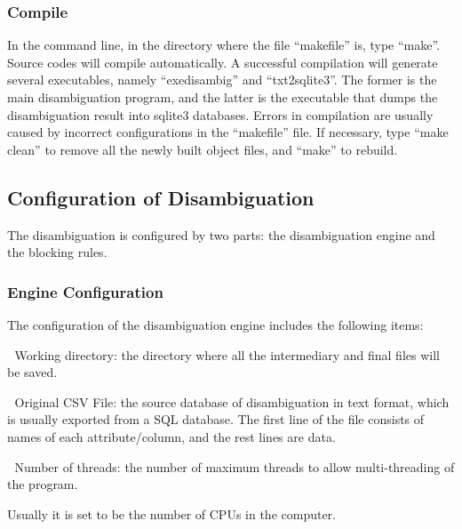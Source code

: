 \documentclass{article}
\begin{document}
\subsubsection{Compile}

In the command line, in the directory where the 
file “makefile” is, type “make”. 
Source codes will compile automatically. A successful 
compilation will generate several executables, namely
“exedisambig” and “txt2sqlite3”. 
The former is the main disambiguation program, and the 
latter is the executable that dumps the disambiguation 
result into sqlite3 databases. Errors in compilation are 
usually caused by incorrect configurations in 
the “makefile” file. If necessary, type 
“make clean” to remove all the newly built 
object files, and “make” to rebuild.


\subsection{Configuration of Disambiguation}

The disambiguation is configured by two parts: 
the disambiguation engine and the blocking rules.


\subsubsection{Engine Configuration}

The configuration of the disambiguation engine includes the following items:

 Working directory: the directory where all the intermediary 
and final files will be saved.

 Original CSV File: the source database of disambiguation in 
text format, which is usually exported from a SQL database. 
The first line of the file consists of names of each
attribute/column, and the rest lines are data.

 Number of threads: the number of maximum threads to 
allow multi-threading of the program.

Usually it is set to be the number of CPUs in the computer.
\end{document}
